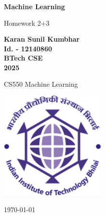 \documentclass[10pt, a4paper]{article}
\newcommand\course{CS550 Machine Learning}                            %
\newcommand\hwnumber{  2+3}                                 %
\newcommand\Information{Karan Sunil Kumbhar }                        %
\newcommand\Informatio{Id. - 12140860}
\newcommand\Informati{BTech CSE}
\newcommand\Informat{2025}
\begin{document}
\justify
\sloppy

\begin{titlepage}
    \begin{center}
        \vspace*{3cm}

        \Huge
        \textbf{Machine Learning}

        \vspace{1cm}
        \huge
        Homework\hwnumber

        \vspace{1.5cm}
        \Large

        \textbf{\Information}\\                      %
        \textbf{\Informatio}\\
        \textbf{\Informati} \\
        \textbf{\Informat} \\

        \vfill

        \course \

        \vspace{1cm}

        \includegraphics[width=0.4\textwidth]{iitbh.png}
        \\

        \Large

        \today

    \end{center}
\end{titlepage}


\newpage
\subsubsection*{}
\end{document}
